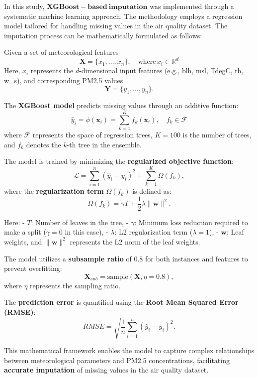 In this study, $\mathbf{XGBoost-based\:imputation}$ was implemented through a systematic machine learning approach. The methodology employs a regression model tailored for handling missing values in the air quality dataset. The imputation process can be mathematically formulated as follows:

Given a set of meteorological features
\[
\mathbf{X} = \{x_1, \dots, x_n\}, \quad \text{where} \, x_i \in \mathbb{R}^d
\]
Here, \( x_i \) represents the \( d \)-dimensional input features (e.g., blh, msl, TdegC, rh, w_s), and corresponding PM2.5 values
\[
\mathbf{Y} = \{y_1, \dots, y_n\}.
\]

The \textbf{XGBoost model} predicts missing values through an additive function:
\[
\hat{y}_i = \phi(\mathbf{x}_i) = \sum_{k=1}^K f_k(\mathbf{x}_i), \quad f_k \in \mathcal{F}
\]
where \( \mathcal{F} \) represents the space of regression trees, \( K = 100 \) is the number of trees, and \( f_k \) denotes the \( k \)-th tree in the ensemble.

The model is trained by minimizing the \textbf{regularized objective function}:
\[
\mathcal{L} = \sum_{i=1}^n (\hat{y}_i - y_i)^2 + \sum_{k=1}^K \Omega(f_k),
\]
where the \textbf{regularization term} \( \Omega(f_k) \) is defined as:
\[
\Omega(f_k) = \gamma T + \frac{1}{2}\lambda \|\mathbf{w}\|^2.
\]

Here:
- \( T \): Number of leaves in the tree,
- \( \gamma \): Minimum loss reduction required to make a split (\( \gamma = 0 \) in this case),
- \( \lambda \): L2 regularization term (\( \lambda = 1 \)),
- \( \mathbf{w} \): Leaf weights, and \( \|\mathbf{w}\|^2 \) represents the L2 norm of the leaf weights.

The model utilizes a \textbf{subsample ratio} of 0.8 for both instances and features to prevent overfitting:
\[
\mathbf{X}_{sub} = \text{sample}(\mathbf{X}, \eta=0.8),
\]
where \( \eta \) represents the sampling ratio.

The \textbf{prediction error} is quantified using the \textbf{Root Mean Squared Error (RMSE)}:
\[
RMSE = \sqrt{\frac{1}{n} \sum_{i=1}^n (\hat{y}_i - y_i)^2}.
\]

This mathematical framework enables the model to capture complex relationships between meteorological parameters and PM2.5 concentrations, facilitating \textbf{accurate imputation} of missing values in the air quality dataset.




